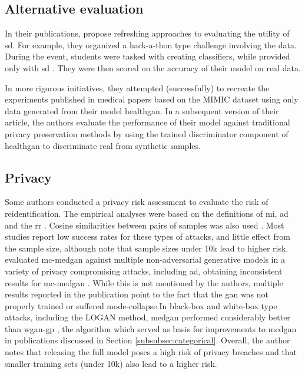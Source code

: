                 
                
                

    \subsection{Alternative evaluation}
        In their publications, \citeauthor{Yale_2020} propose refreshing approaches to evaluating the utility of \gls{sd}. For example, they organized a hack-a-thon type challenge involving the data. During the event, students were tasked with creating classifiers, while provided only with \gls{sd} \cite{Yale_2020}. They were then scored on the accuracy of their model on real data.\par
        In more rigorous initiatives, they attempted (successfully) to recreate the experiments published in medical papers based on the MIMIC dataset using only data generated from their model \gls{healthgan}. In a subsequent version of their article, the authors evaluate the performance of their model against traditional privacy preservation methods by using the trained discriminator component of \gls{healthgan} to discriminate real from synthetic samples.
        
    \subsection{Privacy}
        Some authors conducted a privacy risk assessment to evaluate the risk of reidentification. The empirical analyses were based on the definitions of \gls{mi}, \gls{ad}  \cite{Choi2017-nt,Goncalves2020,yan2020generating,chen2019ganleaks, chincheong2020generation} and the \gls{rr} \cite{Zhang2020}. Cosine similarities between pairs of samples was also used \cite{torfi2019generating}. Most studies report low success rates for these types of attacks, and little effect from the sample size, although \citeauthor{chen2019ganleaks} note that sample sizes under 10k lead to higher risk. \citeauthor{Goncalves2020} evaluated \gls{mc-medgan} against multiple non-adversarial generative models in a variety of privacy compromising attacks, including \gls{ad}, obtaining inconsistent results for \gls{mc-medgan} \cite{Goncalves2020}. While this is not mentioned by the authors, multiple results reported in the publication point to the fact that the \gls{gan} was not properly trained or suffered mode-collapse.In black-box and white-box type attacks, including the LOGAN \cite{hayes2017logan} method, \gls{medgan} performed considerably better than \gls{wgan-gp} \cite{chen2019ganleaks}, the algorithm which served as basis for improvements to \gls{medgan} in publications discussed in Section \ref{subsubsec:categorical}. Overall, the author notes that releasing the full model poses a high risk of privacy breaches and that smaller training sets (under 10k) also lead to a higher risk. \par
